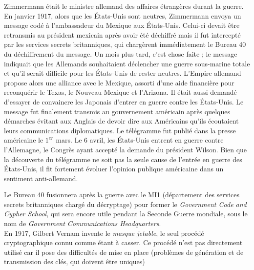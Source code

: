 Zimmermann était le ministre allemand des affaires étrangères durant la
guerre. En janvier 1917, alors que les États-Unis sont neutres,
Zimmermann envoya un message codé à l'ambassadeur du Mexique aux 
États-Unis. Celui-ci devait être retransmis au président mexicain après
avoir été déchiffré mais il fut intercepté par les services
secrets britanniques, qui chargèrent immédiatement le Bureau 40 du
déchiffrement du message. Un mois plus tard, c'est chose faite ; le
message indiquait que les Allemands souhaitaient déclencher une guerre
sous-marine totale et qu'il serait difficile pour les États-Unis
de rester neutres. L'Empire allemand propose alors une alliance avec le
Mexique, assorti d'une aide financière pour reconquérir le Texas, le
Nouveau-Mexique et l'Arizona. Il était aussi demandé d'essayer de
convaincre les Japonais d'entrer en guerre contre les États-Unis.
Le message fut finalement transmis au gouvernement américain après
quelques démarches évitant aux Anglais de devoir dire aux Américains
qu'ils écoutaient leurs communications diplomatiques. Le télégramme
fut publié dans la presse américaine le $1^{er}$ mars. Le 6 avril, les
États-Unis entrent en guerre contre l'Allemagne, le Congrès ayant
accepté la demande du président Wilson. Bien que la découverte du télégramme 
ne soit
pas la seule cause de l'entrée en guerre des États-Unis, il fit
fortement évoluer l'opinion publique américaine dans un sentiment
anti-allemand.

Le Bureau 40 fusionnera après la guerre avec le MI1 (département des
services secrets britanniques chargé du décryptage) pour former le
\emph{Government Code and Cypher School}, qui sera encore utile
pendant la Seconde Guerre mondiale, sous le nom de \emph{Government
  Communications Headquarters}. \\

En 1917, Gilbert Vernam invente le \emph{masque jetable}, le
seul procédé cryptographique connu comme étant à casser. Ce
procédé n'est pas directement utilisé car il pose des difficultés de
mise en place (problèmes de génération et de transmission des clés,
qui doivent être uniques) \\%

